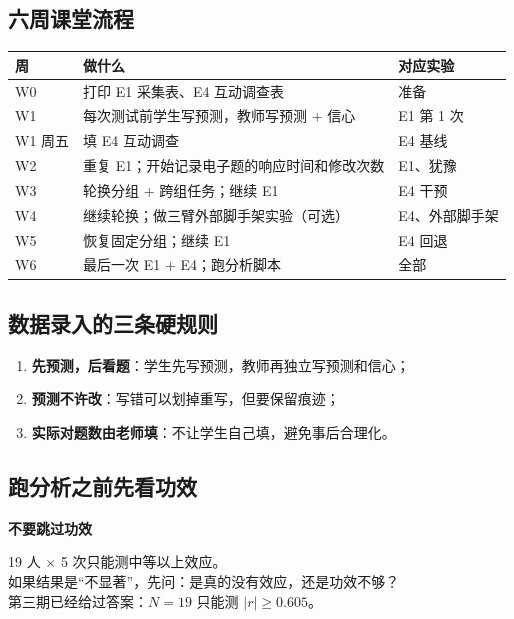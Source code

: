 \documentclass[UTF8,a4paper,11pt]{ctexart}
\newenvironment{explainbox}[1]
{\begin{center}\begin{minipage}{0.94\textwidth}\colorbox{boxbg}{\parbox{0.92\textwidth}{\textbf{#1}\par\vspace{2pt}}}}
{\end{minipage}\end{center}}
\begin{document}
\subsection{六周课堂流程}

\begin{center}
\begin{longtable}{@{}p{1.8cm}p{4.2cm}p{7.2cm}@{}}
\toprule
\textbf{周} & \textbf{做什么} & \textbf{对应实验} \\
\midrule
W0 & 打印 E1 采集表、E4 互动调查表 & 准备 \\
W1 & 每次测试前学生写预测，教师写预测 + 信心 & E1 第 1 次 \\
W1 周五 & 填 E4 互动调查 & E4 基线 \\
W2 & 重复 E1；开始记录电子题的响应时间和修改次数 & E1、犹豫 \\
W3 & 轮换分组 + 跨组任务；继续 E1 & E4 干预 \\
W4 & 继续轮换；做三臂外部脚手架实验（可选） & E4、外部脚手架 \\
W5 & 恢复固定分组；继续 E1 & E4 回退 \\
W6 & 最后一次 E1 + E4；跑分析脚本 & 全部 \\
\bottomrule
\end{longtable}
\end{center}

\subsection{数据录入的三条硬规则}

\begin{enumerate}[leftmargin=2em]
\item \textbf{先预测，后看题}：学生先写预测，教师再独立写预测和信心；
\item \textbf{预测不许改}：写错可以划掉重写，但要保留痕迹；
\item \textbf{实际对题数由老师填}：不让学生自己填，避免事后合理化。
\end{enumerate}

\subsection{跑分析之前先看功效}

\begin{explainbox}{不要跳过功效}
19 人 $\times$ 5 次只能测中等以上效应。\\
如果结果是“不显著”，先问：是真的没有效应，还是功效不够？\\
第三期已经给过答案：$N=19$ 只能测 $|r|\ge0.605$。
\end{explainbox}
\end{document}
